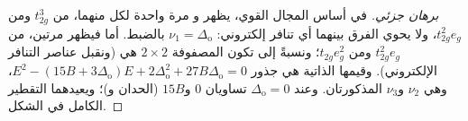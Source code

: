 \begin{proof}[برهان جزئي]
في أساس المجال القوي، يظهر  و مرة واحدة لكل منهما، من $t_{2g}^3$ ومن $t_{2g}^2e_g$، 
ولا يحوي الفرق بينهما أي تنافر إلكتروني: $\nu_1 = \Delta_{\mathrm o}$ بالضبط. أما  فيظهر
مرتين، من $t_{2g}^2e_g$ ومن $t_{2g}e_g^2$؛ ونسبةً إلى  تكون المصفوفة $2\times2$ هي
 (ونقبل عناصر التنافر الإلكتروني).
وقيمها الذاتية هي جذور $E^2 - (15B + 3\Delta_{\mathrm o})E + 2\Delta_{\mathrm o}^2 + 27B\Delta_{\mathrm o} = 0$، وهي
$\nu_2$ و$\nu_3$ المذكورتان. وعند $\Delta_{\mathrm o} = 0$ تساويان 0 و$15B$ (الحدان  و)؛ 
ويعيدهما التقطير الكامل في الشكل.
\end{proof}

